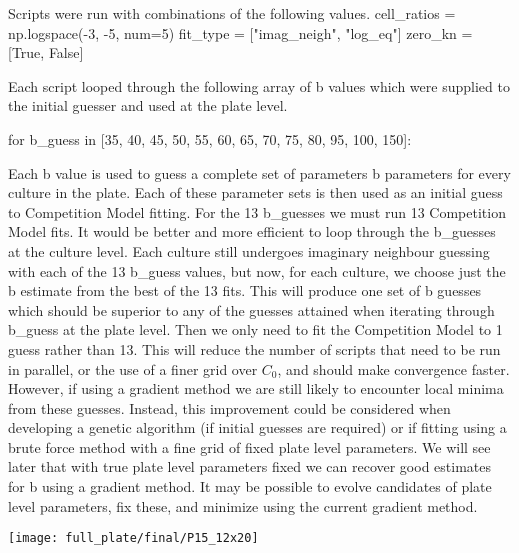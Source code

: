 \begin{multicols}{2}

Scripts were run with combinations of the following values.
cell_ratios = np.logspace(-3, -5, num=5)
fit_type = ["imag_neigh", "log_eq"]
zero_kn = [True, False]

Each script looped through the following array of b values which were
supplied to the initial guesser and used at the plate level.

for b_guess in [35, 40, 45, 50, 55, 60, 65, 70, 75, 80, 95, 100, 150]:

Each b value is used to guess a complete set of parameters b
parameters for every culture in the plate. Each of these parameter
sets is then used as an initial guess to Competition Model
fitting. For the 13 b_guesses we must run 13 Competition Model
fits. It would be better and more efficient to loop through the
b_guesses at the culture level. Each culture still undergoes imaginary
neighbour guessing with each of the 13 b_guess values, but now, for
each culture, we choose just the b estimate from the best of the 13
fits. This will produce one set of b guesses which should be superior
to any of the guesses attained when iterating through b_guess at the
plate level. Then we only need to fit the Competition Model to 1 guess
rather than 13. This will reduce the number of scripts that need to be
run in parallel, or the use of a finer grid over \(C_{0}\), and should
make convergence faster. However, if using a gradient method we are
still likely to encounter local minima from these guesses. Instead,
this improvement could be considered when developing a genetic
algorithm (if initial guesses are required) or if fitting using a
brute force method with a fine grid of fixed plate level
parameters. We will see later that with true plate level parameters
fixed we can recover good estimates for b using a gradient method. It
may be possible to evolve candidates of plate level parameters, fix
these, and minimize using the current gradient method.

\end{multicols}
\begin{landscape}
\graphicspath{{images/comp_fit/}}
\begin{Figure}
  \centering
  \texttt{[image: full\_plate/final/P15\_12x20]}
  \label{fig:comp_fit_plate}
\end{Figure}
\end{landscape}
\begin{multicols}{2}

\end{multicols}
